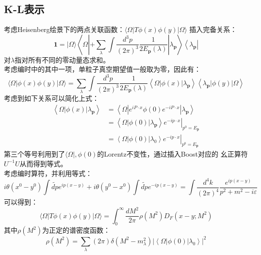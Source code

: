 \documentclass{article}
\begin{document}
\subsection{K-L表示}
考虑Heisenberg绘景下的两点关联函数：$ \langle\Omega|T \phi(x) \phi(y)| \Omega\rangle $
插入完备关系： 
\begin{equation}
  \mathbf{1}=|\Omega\rangle\left\langle\Omega\left|+\sum_\lambda \int \frac{d^3 p}{(2 \pi)^3} \frac{1}{2 E_{\mathbf{p}}(\lambda)}\right| \lambda_{\mathbf{p}}\right\rangle\left\langle\lambda_{\mathbf{p}}\right|
\end{equation}
对$ \lambda $指对所有不同的零动量态求和。\\

考虑编时中的其中一项，单粒子真空期望值一般取为零，因此有：
\begin{equation}
  \langle\Omega|\phi(x) \phi(y)| \Omega\rangle=\sum_\lambda \int \frac{d^3 p}{(2 \pi)^3} \frac{1}{2 E_{\mathbf{p}}(\lambda)}\left\langle\Omega|\phi(x)| \lambda_{\mathbf{p}}\right\rangle\left\langle\lambda_{\mathbf{p}}|\phi(y)| \Omega\right\rangle
\end{equation}
考虑到如下关系可以简化上式：
\begin{equation}
  \begin{aligned}
    \left\langle\Omega|\phi(x)| \lambda_{\mathbf{p}}\right\rangle & =\left\langle\Omega\left|e^{i P \cdot x} \phi(0) e^{-i P \cdot x}\right| \lambda_{\mathbf{p}}\right\rangle \\
    & =\left.\left\langle\Omega|\phi(0)| \lambda_{\mathbf{p}}\right\rangle e^{-i p \cdot x}\right|_{p^0=E_{\mathbf{p}}} \\
    & =\left.\left\langle\Omega|\phi(0)| \lambda_0\right\rangle e^{-i p \cdot x}\right|_{p^0=E_{\mathbf{p}}}
    \end{aligned}
    \label{rela}
\end{equation}
第三个等号利用到了$ \langle\Omega|, \phi(0) $的Lorentz不变性，通过插入Boost对应的
幺正算符$ U^{-1}U $从而得到等式。\\

考虑编时算符，并利用等式：
\begin{equation}
  i \theta\left(x^0-y^0\right) \int \widetilde{d p} e^{i p(x-y)}+i \theta\left(y^0-x^0\right) \int \widetilde{d p} e^{-i p(x-y)}=\int \frac{d^4 k}{(2 \pi)^4} \frac{e^{i p(x-y)}}{p^2+m^2-i \varepsilon}
\end{equation}
可以得到：
\begin{equation}
  \langle\Omega|T \phi(x) \phi(y)| \Omega\rangle=\int_0^{\infty} \frac{d M^2}{2 \pi} \rho\left(M^2\right) D_F\left(x-y ; M^2\right)
\end{equation}
其中$ \rho(M^2) $为正定的谱密度函数：
\begin{equation}
  \rho\left(M^2\right)=\sum_\lambda(2 \pi) \delta\left(M^2-m_\lambda^2\right)\left|\left\langle\Omega|\phi(0)| \lambda_0\right\rangle\right|^2
\end{equation} 
\end{document}
